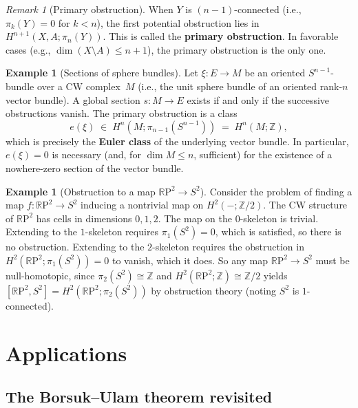 \documentclass[12pt,a4paper,openany]{book}
\theoremstyle{definition}
\newtheorem{example}[definition]{Example}
\theoremstyle{plain}
\theoremstyle{remark}
\newtheorem{remark}[definition]{Remark}
\newcommand{\Z}{\mathbb{Z}}
\newcommand{\RP}{\mathbb{R}\mathrm{P}}
\begin{document}
\begin{remark}[Primary obstruction]
When $Y$ is $(n{-}1)$-connected (i.e., $\pi_k(Y)=0$ for $k<n$), the
first potential obstruction lies in $H^{n+1}(X,A;\pi_n(Y))$.  This is
called the \textbf{primary obstruction}.  In favorable cases (e.g.,
$\dim(X\setminus A)\le n+1$), the primary obstruction is the only one.
\end{remark}

\begin{example}[Sections of sphere bundles]
Let $\xi\colon E\to M$ be an oriented $S^{n-1}$-bundle over a CW
complex~$M$ (i.e., the unit sphere bundle of an oriented rank-$n$
vector bundle).  A global section $s\colon M\to E$ exists if and only
if the successive obstructions vanish.  The primary obstruction is
a class
\[
  e(\xi)\;\in\; H^n(M;\pi_{n-1}(S^{n-1}))\;=\;H^n(M;\Z),
\]
which is precisely the \textbf{Euler class} of the
underlying vector bundle.  In particular, $e(\xi)=0$ is necessary
(and, for $\dim M\le n$, sufficient) for the existence of a nowhere-zero
section of the vector bundle.
\end{example}

\begin{example}[Obstruction to a map $\RP^2\to S^2$]
Consider the problem of finding a map $f\colon\RP^2\to S^2$ inducing
a nontrivial map on $H^2(-;\Z/2)$.  The CW structure of $\RP^2$ has
cells in dimensions $0,1,2$.  The map on the $0$-skeleton is trivial.
Extending to the $1$-skeleton requires $\pi_1(S^2)=0$, which is
satisfied, so there is no obstruction.  Extending to the $2$-skeleton
requires the obstruction in $H^2(\RP^2;\pi_1(S^2))=0$ to vanish,
which it does.  So any map $\RP^2\to S^2$ must be null-homotopic,
since $\pi_2(S^2)\cong\Z$ and $H^2(\RP^2;\Z)\cong\Z/2$ yields
$[\RP^2,S^2]=H^2(\RP^2;\pi_2(S^2))$ by obstruction theory (noting
$S^2$ is $1$-connected).
\end{example}

\section{Applications}\label{sec:obstruction-applications}

\subsection{The Borsuk--Ulam theorem revisited}
\end{document}
